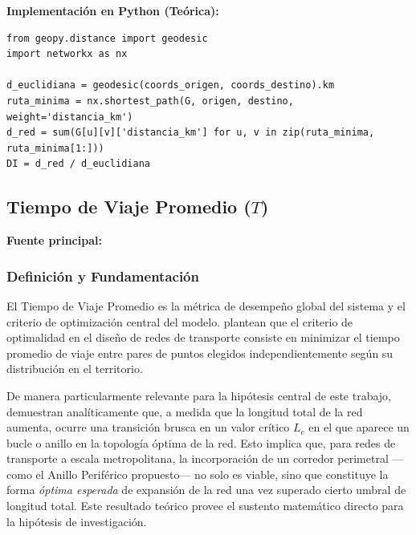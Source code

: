 \textbf{Implementación en Python (Teórica):}

\begin{lstlisting}[style=estiloPython, caption={Cálculo del \textit{Detour Factor} $DI$.}, label={lst:detour}]
from geopy.distance import geodesic
import networkx as nx
 
d_euclidiana = geodesic(coords_origen, coords_destino).km
ruta_minima = nx.shortest_path(G, origen, destino, weight='distancia_km')
d_red = sum(G[u][v]['distancia_km'] for u, v in zip(ruta_minima, ruta_minima[1:]))
DI = d_red / d_euclidiana
\end{lstlisting}

\subsection{Tiempo de Viaje Promedio \texorpdfstring{($T$)}{(T)}}
\label{subsec:tiempo-viaje}

\textbf{Fuente principal:} \textcite{aldous2019optimal}

\subsubsection{Definición y Fundamentación}

El Tiempo de Viaje Promedio es la métrica de desempeño global del sistema y el
criterio de optimización central del modelo. \textcite{aldous2019optimal} plantean
que el criterio de optimalidad en el diseño de redes de transporte consiste en
minimizar el tiempo promedio de viaje entre pares de puntos elegidos
independientemente según su distribución en el territorio.

De manera particularmente relevante para la hipótesis central de este trabajo,
\textcite{aldous2019optimal} demuestran analíticamente que, a medida que la
longitud total de la red aumenta, ocurre una transición brusca en un valor crítico
$L_c$ en el que aparece un bucle o anillo en la topología óptima de la red. Esto
implica que, para redes de transporte a escala metropolitana, la incorporación de un
corredor perimetral ---como el Anillo Periférico propuesto--- no solo es viable, sino
que constituye la forma \textit{óptima esperada} de expansión de la red una vez
superado cierto umbral de longitud total. Este resultado teórico provee el sustento
matemático directo para la hipótesis de investigación.

